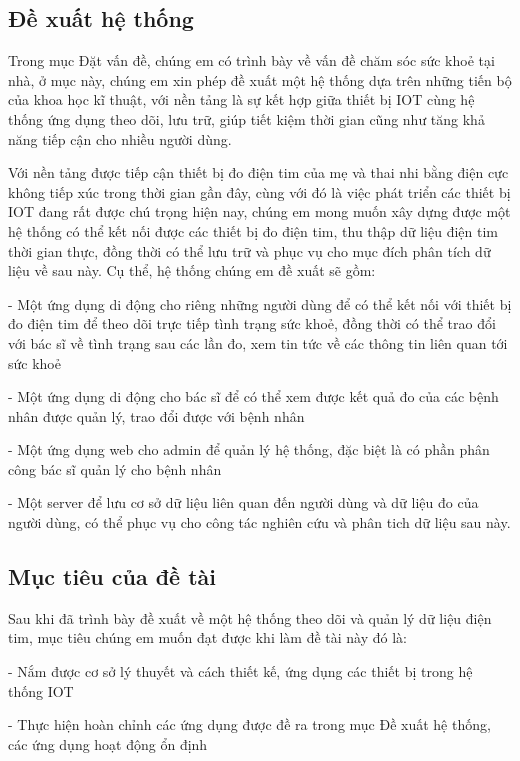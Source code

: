 \subsection*{Đề xuất hệ thống}

Trong mục Đặt vấn đề, chúng em có trình bày về vấn đề chăm sóc sức khoẻ tại nhà, ở mục này, chúng em xin phép đề xuất một hệ thống
dựa trên những tiến bộ của khoa học kĩ thuật, với nền tảng là sự kết hợp giữa thiết bị IOT cùng hệ thống ứng dụng theo dõi, lưu trữ,
giúp tiết kiệm thời gian cũng như tăng khả năng tiếp cận cho nhiều người dùng. 

Với nền tảng được tiếp cận thiết bị đo điện tim của mẹ và thai nhi bằng điện cực không tiếp xúc trong thời gian gần đây, 
cùng với đó là việc phát triển các thiết bị IOT đang rất được chú trọng hiện nay, chúng em mong muốn xây dựng được một hệ thống
có thể kết nối được các thiết bị đo điện tim, thu thập dữ liệu điện tim thời gian thực, đồng thời có thể lưu trữ và phục vụ cho mục đích
phân tích dữ liệu về sau này. Cụ thể, hệ thống chúng em đề xuất sẽ gồm:

- Một ứng dụng di động cho riêng những người dùng để có thể kết nối với thiết bị đo điện tim để theo dõi trực tiếp tình trạng sức khoẻ, đồng
thời có thể trao đổi với bác sĩ về tình trạng sau các lần đo, xem tin tức về các thông tin liên quan tới sức khoẻ

- Một ứng dụng di động cho bác sĩ để có thể xem được kết quả đo của các bệnh nhân được quản lý, trao đổi được với bệnh nhân

- Một ứng dụng web cho admin để quản lý hệ thống, đặc biệt là có phần phân công bác sĩ quản lý cho bệnh nhân

- Một server để lưu cơ sở dữ liệu liên quan đến người dùng và dữ liệu đo của người dùng, có thể phục vụ cho công tác nghiên cứu và
phân tich dữ liệu sau này.

\subsection*{Mục tiêu của đề tài}
Sau khi đã trình bày đề xuất về một hệ thống theo dõi và quản lý dữ liệu điện tim, mục tiêu chúng em muốn đạt được khi
làm đề tài này đó là:

- Nắm được cơ sở lý thuyết và cách thiết kế, ứng dụng các thiết bị trong hệ thống IOT

- Thực hiện hoàn chỉnh các ứng dụng được đề ra trong mục Đề xuất hệ thống, các ứng dụng hoạt động ổn định

